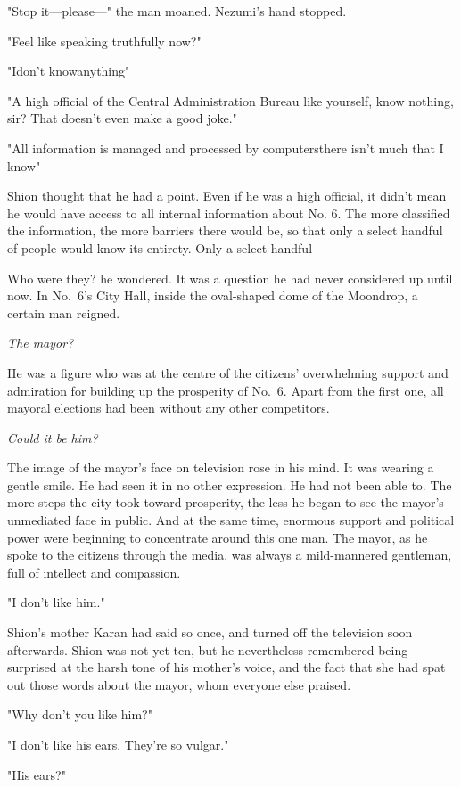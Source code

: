 "Stop it---please---" the man moaned. Nezumi's hand stopped.

"Feel like speaking truthfully now?"

"I\el don't know\el anything\el "

"A high official of the Central Administration Bureau like yourself,
know nothing, sir? That doesn't even make a good joke."

"All information is managed and processed by computers\el there isn't\el 
much that I know\el "

Shion thought that he had a point. Even if he was a high official, it
didn't mean he would have access to all internal information about No.
6. The more classified the information, the more barriers there would
be, so that only a select handful of people would know its entirety.
Only a select handful---

Who were they? he wondered. It was a question he had never considered up
until now. In No.~6's City Hall, inside the oval-shaped dome of the
Moondrop, a certain man reigned.

\emph{The mayor?}

He was a figure who was at the centre of the citizens' overwhelming
support and admiration for building up the prosperity of No.~6. Apart
from the first one, all mayoral elections had been without any other
competitors.

\emph{Could it be him?}

The image of the mayor's face on television rose in his mind. It was
wearing a gentle smile. He had seen it in no other expression. He had
not been able to. The more steps the city took toward prosperity, the
less he began to see the mayor's unmediated face in public. And at the
same time, enormous support and political power were beginning to
concentrate around this one man. The mayor, as he spoke to the citizens
through the media, was always a mild-mannered gentleman, full of
intellect and compassion.

"I don't like him."

Shion's mother Karan had said so once, and turned off the television
soon afterwards. Shion was not yet ten, but he nevertheless remembered
being surprised at the harsh tone of his mother's voice, and the fact
that she had spat out those words about the mayor, whom everyone else
praised.

"Why don't you like him?"

"I don't like his ears. They're so vulgar."

"His ears?"


